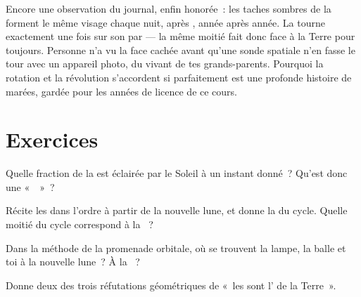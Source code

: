 \begin{remark}\label{rem:g7:moon-phases:sameface}
Encore une observation du journal, enfin honorée~: les taches sombres
de la  forment le même visage chaque nuit,  après ,
année après année. La  tourne exactement une fois sur son  par
 --- la même moitié fait donc face à la Terre pour toujours.
Personne n'a vu la face cachée avant qu'une sonde spatiale n'en fasse
le tour avec un appareil photo, du vivant de tes grands-parents.
Pourquoi la rotation et la révolution s'accordent si parfaitement est
une profonde histoire de marées, gardée pour les années de licence de
ce cours.
\end{remark}

\section{Exercices}

\begin{exercise}[$\star$]\label{exo:g7:moon-phases:1}
Quelle fraction de la  est éclairée par le Soleil à un instant
donné~? Qu'est donc une «~~»~?
\end{exercise}

\begin{exercise}[$\star$]\label{exo:g7:moon-phases:2}
Récite les  dans l'ordre à partir de la nouvelle lune, et donne
la  du cycle. Quelle moitié du cycle correspond à la 
~?
\end{exercise}

\begin{exercise}[$\star$]\label{exo:g7:moon-phases:3}
Dans la méthode de la promenade orbitale, où se trouvent la lampe, la
balle et toi à la nouvelle lune~? À la ~?
\end{exercise}

\begin{exercise}[$\star$]\label{exo:g7:moon-phases:4}
Donne deux des trois réfutations géométriques de «~les  sont
l' de la Terre~».
\end{exercise}

